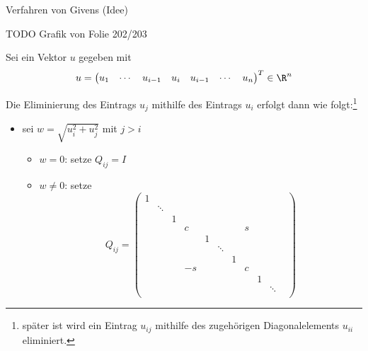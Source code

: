 \begin{bonus}{Verfahren von Givens (Idee)}
    \setcounter{MaxMatrixCols}{20}
    
    TODO Grafik von Folie 202/203
    
    Sei ein Vektor $u$ gegeben mit
    \[
        u =
        \begin{pmatrix}
            u_1 & \cdots & u_{i-1} & u_{i} & u_{i-1} & \cdots & u_{n}
        \end{pmatrix}^T
        \in \R^n
    \]
    
    Die Eliminierung des Eintrags $u_{j}$ mithilfe des Eintrags $u_{i}$ erfolgt dann wie folgt:\footnote{später ist wird ein Eintrag $u_{ij}$ mithilfe des zugehörigen Diagonalelements $u_{ii}$ eliminiert.}
    \begin{itemize}
        \item sei $w = \sqrt{u_i^2 + u_j^2}$ mit $j > i$
              \begin{itemize}
                  \item $w = 0$: setze $Q_{ij} = I$
                  \item $w \neq 0$: setze
                        \[
                            Q_{ij} =
                            \begin{pmatrix}
                                1 &        &   &    &   &        &   &   &   &        &   \\
                                  & \ddots &   &    &   &        &   &   &   &        &   \\
                                  &        & 1 &    &   &        &   &   &   &        &   \\
                                  &        &   & c  &   &        &   & s &   &        &   \\
                                  &        &   &    & 1 &        &   &   &   &        &   \\
                                  &        &   &    &   & \ddots &   &   &   &        &   \\
                                  &        &   &    &   &        & 1 &   &   &        &   \\
                                  &        &   & -s &   &        &   & c &   &        &   \\
                                  &        &   &    &   &        &   &   & 1 &        &   \\
                                  &        &   &    &   &        &   &   &   & \ddots &   \\

\end{pmatrix}\]
\end{itemize}
\end{itemize}
\end{bonus}
